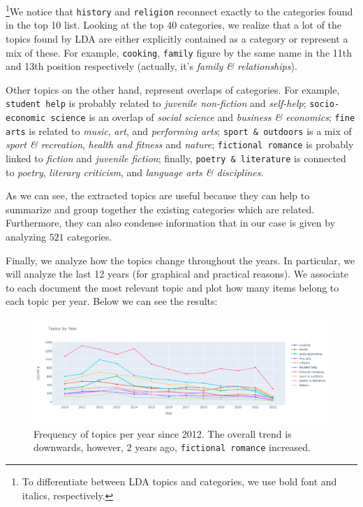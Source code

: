 \documentclass[a4paper,10pt, openright]{article}
\begin{document}
\footnote{To differentiate between LDA topics and categories, we use bold font and italics, respectively.}We notice that \texttt{history} and \texttt{religion} reconnect exactly to the categories found in the top 10 list. Looking at the top 40 categories, we realize that a lot of the topics found by LDA are either explicitly contained as a category or represent a mix of these. For example, \texttt{cooking}, \texttt{family} figure by the same name in the 11th and 13th position respectively (actually, it's \textit{family \& relationships}). 

Other topics on the other hand, represent overlaps of categories. For example, \texttt{student help} is probably related to \textit{juvenile non-fiction} and \textit{self-help}; \texttt{socio-economic science} is an overlap of \textit{social science} and \textit{business \& economics}; \texttt{fine arts} is related to \textit{music}, \textit{art}, and \textit{performing arts}; \texttt{sport \& outdoors} is a mix of \textit{sport \& recreation}, \textit{health and fitness} and \textit{nature}; \texttt{fictional romance} is probably linked to \textit{fiction} and \textit{juvenile fiction}; finally, \texttt{poetry \& literature} is connected to \textit{poetry}, \textit{literary criticism}, and \textit{language arts \& disciplines}.

As we can see, the extracted topics are useful because they can help to summarize and group together the existing categories which are related. Furthermore, they can also condense information that in our case is given by analyzing $521$ categories.

Finally, we analyze how the topics change throughout the years. In particular, we will analyze the last 12 years (for graphical and practical reasons). We associate to each document the most relevant topic and plot how many items belong to each topic per year. Below we can see the results:


\begin{figure}[H]
	\begin{center}
		\includegraphics[width=16 cm, height=9 cm]{./Images/topicsbyyear.png}
		\caption{Frequency of topics per year since 2012. The overall trend is downwards, however, 2 years ago, \texttt{fictional romance} increased.}
		\label{fig:topicyears}
	\end{center}
\end{figure}
\end{document}

